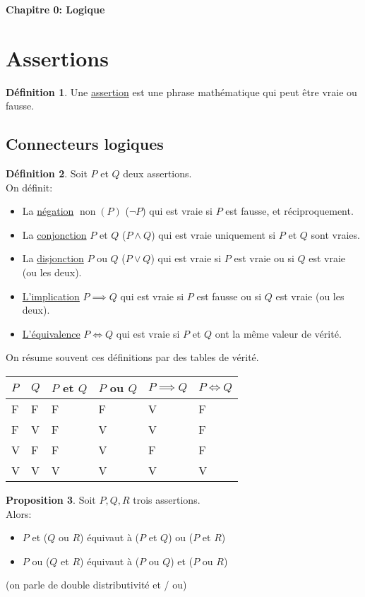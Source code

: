 \documentclass[10pt,a4paper]{article}
\theoremstyle{definition}
\newtheorem{proposition}{Proposition}[section]
\newtheorem{definition}[proposition]{Définition}
\DeclareMathOperator{\non}{non}
\begin{document}
\renewcommand{\labelitemi}{$*$}
\begin{center}
{\Large \textbf{Chapitre 0: Logique}}
\end{center}

\section{Assertions}
\begin{definition}
Une \uline{assertion} est une phrase mathématique qui peut être vraie ou fausse.
\end{definition}
\subsection{Connecteurs logiques}
\begin{definition}
Soit $P$ et $Q$ deux assertions. \\
On définit:
\begin{itemize}
\item La \uline{négation} $\non(P)$ ($\neg P$) qui est vraie si $P$ est fausse, et réciproquement.
\item La \uline{conjonction} $P$ et $Q$ ($P \wedge Q$) qui est vraie uniquement si $P$ et $Q$ sont vraies.
\item La \uline{disjonction} $P$ ou $Q$ ($P \vee Q$) qui est vraie si $P$ est vraie ou si $Q$ est vraie (ou les deux).
\item \uline{L'implication} $P \implies Q$ qui est vraie si $P$ est fausse ou si $Q$ est vraie (ou les deux).
\item \uline{L'équivalence} $P \iff Q$ qui est vraie si $P$ et $Q$ ont la même valeur de vérité.
\end{itemize}
On résume souvent ces définitions par des tables de vérité.
\begin{center}
\begin{tabular}{M{5em} | M{5em} | M{5em} | M{5em} | M{5em} | M{5em}}
$P$ & $Q$ & $P$ et $Q$ & $P$ ou $Q$ & $P \implies Q$ & $P \iff Q$ \\
\hline
F & F & F & F & V & F \\
\hline
F & V & F & V & V & F \\
\hline
V & F & F & V & F & F \\
\hline
V & V & V & V & V & V 
\end{tabular}
\end{center}
\end{definition}
\begin{proposition}
Soit $P, Q, R$ trois assertions. \\
Alors:
\begin{itemize}
\item $P$ et ($Q$ ou $R$) équivaut à ($P$ et $Q$) ou ($P$ et $R$)
\item $P$ ou ($Q$ et $R$) équivaut à ($P$ ou $Q$) et ($P$ ou $R$)
\end{itemize}
(on parle de double distributivité et / ou)
\end{proposition}
\end{document}
